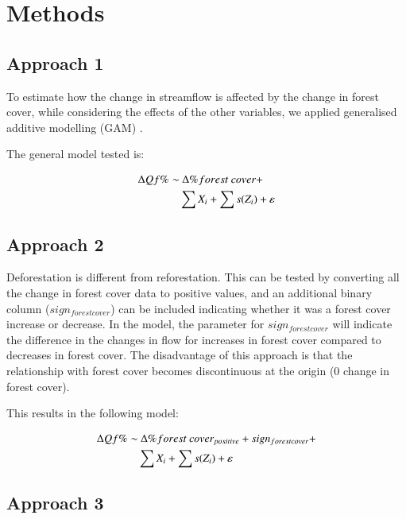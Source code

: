 \documentclass[]{elsarticle} %
\begin{document}
\hypertarget{methods}{%
\section{Methods}\label{methods}}

\hypertarget{approach-1}{%
\subsection{Approach 1}\label{approach-1}}

To estimate how the change in streamflow is affected by the change in forest cover, while considering the effects of the other variables, we applied generalised additive modelling (GAM) \citep{wood2006}.

The general model tested is:

\begin{align}
\Delta Qf \% \sim &~ \Delta \% forest~cover + \notag \\ 
& \sum{X_i} + \sum{s(Z_i)} + \varepsilon \label{eq:eq1}
\end{align}

\hypertarget{approach-2}{%
\subsection{Approach 2}\label{approach-2}}

Deforestation is different from reforestation. This can be tested by converting all the change in forest cover data to positive values, and an additional binary column (\(sign_{forest cover}\)) can be included indicating whether it was a forest cover increase or decrease. In the model, the parameter for \(sign_{forest cover}\) will indicate the difference in the changes in flow for increases in forest cover compared to decreases in forest cover. The disadvantage of this approach is that the relationship with forest cover becomes discontinuous at the origin (0 change in forest cover).

This results in the following model:

\begin{align}
\Delta Qf \% \sim &~ \Delta \% forest~cover_{positive} + sign_{forest cover} + \notag \\ 
& \sum{X_i} + \sum{s(Z_i)} + \varepsilon \label{eq:eq2}
\end{align}

\hypertarget{approach-3}{%
\subsection{Approach 3}\label{approach-3}}
\end{document}
